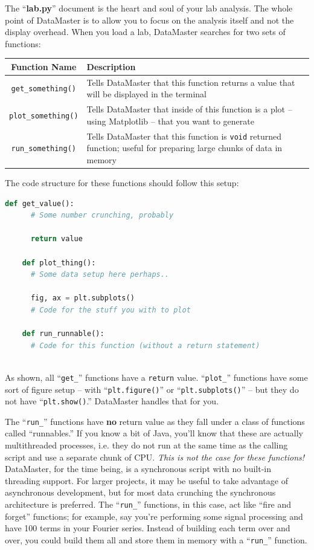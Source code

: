 \documentclass[12pt]{article}
\begin{document}
{The ``\textbf{lab.py}'' document is the heart and soul of your lab analysis. The whole point of DataMaster is to allow you to focus on the analysis itself and not the display overhead. When you load a lab, DataMaster searches for two sets of functions:
\begin{framed}
  \centering
  {
  \setlength{\tabcolsep}{14pt}
  \renewcommand{\arraystretch}{2.5}
    \begin{tabular}{ c | m{}}
      Function Name & Description\\\hline
      \texttt{get\_something()} & Tells DataMaster that this function returns a value that will be displayed in the terminal \\
      \texttt{plot\_something()} & Tells DataMaster that inside of this function is a plot -- using Matplotlib -- that you want to generate \\
      \texttt{run\_something()} & Tells DataMaster that this function is \texttt{void} returned function; useful for preparing large chunks of data in memory
    \end{tabular}
  }
\end{framed}
The code structure for these functions should follow this setup:
\begin{framed}
  \begin{lstlisting}[language=Python]
    def get_value():
      # Some number crunching, probably
      
      return value
    
    def plot_thing():
      # Some data setup here perhaps..
      
      fig, ax = plt.subplots()
      # Code for the stuff you with to plot
    
    def run_runnable():
      # Code for this function (without a return statement)
            
  \end{lstlisting}
\end{framed}
As shown, all ``\texttt{get\_}'' functions have a \texttt{return} value. ``\texttt{plot\_}'' functions have some sort of figure setup -- with ``\texttt{plt.figure()}'' or ``\texttt{plt.subplots()}'' -- but they do not have ``\texttt{plt.show()}.'' DataMaster handles that for you. 

The ``\texttt{run\_}'' functions have \textbf{no} return value as they fall under a class of functions called ``runnables.'' If you know a bit of Java, you'll know that these are actually multithreaded processes, i.e. they do not run at the same time as the calling script and use a separate chunk of CPU. \textit{This is not the case for these functions!} DataMaster, for the time being, is a synchronous script with no built-in threading support. For larger projects, it may be useful to take advantage of asynchronous development, but for most data crunching the synchronous architecture is preferred. The ``\texttt{run\_}'' functions, in this case, act like ``fire and forget'' functions; for example, say you're performing some signal processing and have 100 terms in your Fourier series. Instead of building each term over and over, you could build them all and store them in memory with a ``\texttt{run\_}'' function.

}
\end{document}
